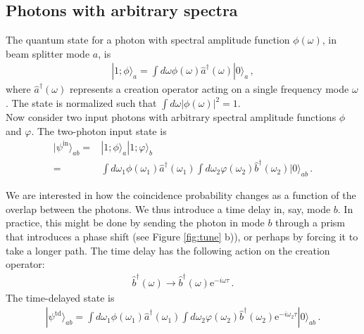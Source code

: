 \documentclass[12pt]{article}
\newcommand{\ket}[2] {| #1 \rangle_{#2}}
\newcommand{\dg}{^{\dagger}}
\newcommand{\ee}[1] {\mathrm{e}^{#1}}
\begin{document}
\subsection{Photons with arbitrary spectra}\label{sec:arb}

The quantum state for a photon with spectral amplitude function  $\phi(\omega)$, in beam splitter mode $a$, is
\begin{align}
\ket{1;\phi}{a}=\int d\omega \phi(\omega)\hat{a}\dg(\omega)\ket{0}{a}\,,
\end{align}
where $\hat{a}\dg(\omega)$ represents a creation operator acting on a single frequency mode $\omega$. The state is normalized such that $\int d\omega|\phi(\omega)|^2=1$. \\

Now consider  two input photons with arbitrary  spectral amplitude functions $\phi$ and $\varphi$.  The two-photon input state is
\begin{align}\label{eq:onein}
\ket{\psi^{\mathrm{in}}}{ab}={}&\ket{1;\phi}{a}\ket{1;\varphi}{b}\\\label{eq:sep}
={}&\int d\omega_{1} \phi(\omega_{1})\hat{a}\dg(\omega_{1})\int d\omega_{2} \varphi(\omega_{2})\hat{b}\dg(\omega_{2})\ket{0}{ab}\,.
\end{align}

We are interested in how the coincidence probability changes as a function of the overlap between the photons. We thus introduce a time delay in, say, mode $b$. In practice, this might be done by sending the photon in mode $b$  through a prism that introduces a phase shift (see Figure \ref{fig:tune} b)), or perhaps by forcing it to take a longer path. The time delay has the following action on the creation operator:
\begin{align}\label{eq:td}
\hat{b}\dg(\omega)\rightarrow \hat{b}\dg(\omega)\ee{-i\omega \tau}\,.
\end{align}
The time-delayed state is
\begin{align}
\ket{\psi^{\mathrm{td}}}{ab}={}\int d\omega_{1} \phi(\omega_{1})\hat{a}\dg(\omega_{1})\int d\omega_{2} \varphi(\omega_{2})\hat{b}\dg(\omega_{2})\ee{-i\omega_{2} \tau}\ket{0}{ab}\,.
\end{align}
\end{document}
